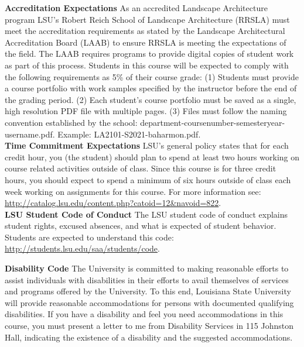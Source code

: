 \documentclass[11pt,article,oneside]{memoir}
\begin{document}
\noindent \textbf{Accreditation Expectations}
As an accredited Landscape Architecture program
LSU's Robert Reich School of Landscape Architecture (RRSLA)
must meet the accreditation requirements
as stated by the Landscape Architectural Accreditation
Board (LAAB) to ensure RRSLA is meeting the expectations of the field.
The LAAB requires programs to provide digital copies
of student work as part of this process.
Students in this course will be expected
to comply with the following requirements
as 5\% of their course grade:
(1) Students must provide a course portfolio
with work samples specified by the instructor
before the end of the grading period.
(2) Each student's course portfolio must be saved as
a single, high resolution PDF file with multiple pages.
(3) Files must follow the naming convention
established by the school: department-coursenumber-semesteryear-username.pdf.
Example: LA2101-S2021-baharmon.pdf.\\


\noindent \textbf{Time Commitment Expectations}
LSU's general policy states that for each credit hour, you (the student) should plan to
spend at least two hours working on course related activities outside of class. Since this course is for three credit hours, you should expect to spend a minimum of six hours outside of class each week working on assignments for this course. For more information see:
\url{http://catalog.lsu.edu/content.php?catoid=12&navoid=822}.\\

\noindent \textbf{LSU Student Code of Conduct}
The LSU student code of conduct explains student rights, excused absences, and what is expected of student behavior. Students are expected to understand this code:  \url{http://students.lsu.edu/saa/students/code}.\\ %

\clearpage

\noindent \textbf{Disability Code}
The University is committed to making reasonable efforts to assist individuals with disabilities in
their efforts to avail themselves of services and programs offered by the University. To this end,
Louisiana State University will provide reasonable accommodations for persons with
documented qualifying disabilities. If you have a disability and feel you need accommodations in
this course, you must present a letter to me from Disability Services in 115 Johnston Hall,
indicating the existence of a disability and the suggested accommodations.\\
\end{document}
